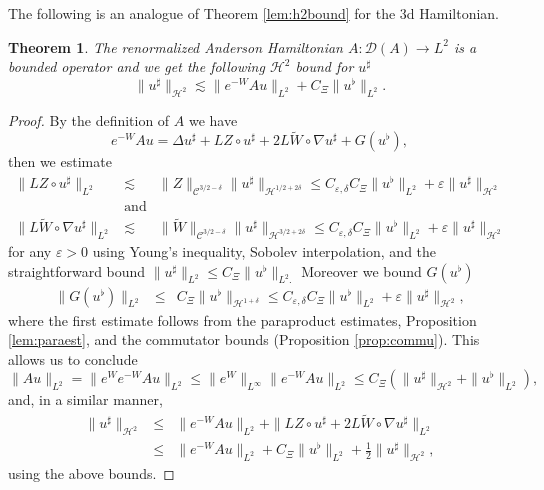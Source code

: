 \documentclass[11pt, oneside]{article}   	%
\newtheorem{theorem}{Theorem}[section]
\newcommand{\CC}{\mathscr{C}}
\newcommand{\ssp}{\mathscr{H}}
\begin{document}
%
The following is an analogue of Theorem \ref{lem:h2bound} for the 3d
Hamiltonian.
%
\begin{theorem} \label{thm:3dusharpbound}
	The renormalized Anderson Hamiltonian 
	$A : \mathscr{D}(A) \rightarrow L^2$
	is a bounded operator and we get the following $\ssp^2$ bound for $u^{\sharp}$
	\begin{equation} \label{equ:usharpBound}
	\| u^{\sharp} \|_{\ssp^2} \lesssim \| e^{- W} A u \|_{L^2} + C_{\Xi} \|
	u^{\flat} \|_{L^2} . 
	\end{equation}
\end{theorem}
%
\begin{proof}
	By the definition of $A$ we have
	\[ e^{- W} A u = \Delta u^{\sharp} + L Z \circ u^{\sharp} + 2L \widetilde{W}
	\circ \nabla u^{\sharp} + G (u^{\flat}), \]
	then we estimate\quad
	\begin{eqnarray*}
		\| L Z \circ u^{\sharp} \|_{L^2} & \lesssim & \| Z \|_{\CC^{3 / 2
				- \delta}} \| u^{\sharp} \|_{\ssp^{1 / 2 + 2 \delta}} 
		 \le  C_{\varepsilon, \delta} C_{\Xi} \| u^{\flat} \|_{L^2} +
		\varepsilon \| u^{\sharp} \|_{\ssp^2}\\
		& \text{and} & \\
		\| L \widetilde{W} \circ \nabla u^{\sharp} \|_{L^2} & \lesssim & \| \widetilde{W}
		\|_{\CC^{3 / 2 - \delta}} \| u^{\sharp} \|_{\ssp^{3 / 2 + 2 \delta}}
		 \le  C_{\varepsilon, \delta} C_{\Xi} \| u^{\flat} \|_{L^2} +
		\varepsilon \| u^{\sharp} \|_{\ssp^2}
	\end{eqnarray*}
	for any $\varepsilon > 0$ using Young's inequality, Sobolev interpolation,
	and the straightforward bound $\| u^{\sharp} \|_{L^2} \le C_{\Xi} \|
	u^{\flat} \|_{L^2 .}$ Moreover we bound $G (u^{\flat})$
	\begin{eqnarray*}
		\| G (u^{\flat}) \|_{L^2} & \le & C_{\Xi} \| u^{\flat} \|_{\ssp^{1 +
				\delta}}
		 \le  C_{\varepsilon, \delta} C_{\Xi} \| u^{\flat} \|_{L^2} +
		\varepsilon \| u^{\sharp} \|_{\ssp^2},
	\end{eqnarray*}
	where the first estimate follows from the paraproduct estimates, Proposition
	\ref{lem:paraest}, and the commutator bounds  (Proposition
	\ref{prop:commu}). This allows us to conclude
	\begin{equation} \label{equ:usharpbound2}
		\| A u \|_{L^2}  =  \| e^W e^{- W} A u \|_{L^2}
		 \le  \| e^W \|_{L^{\infty}} \| e^{- W} A u \|_{L^2}
		\le  C_{\Xi} (\| u^{\sharp} \|_{\ssp^2} + \| u^{\flat} \|_{L^2}),
	\end{equation}
	and, in a similar manner,
	\begin{eqnarray*}
		\| u^{\sharp} \|_{\ssp^2} & \le & \| e^{- W} A u \|_{L^2} + \| L Z
		\circ u^{\sharp} + 2L \widetilde{W} \circ \nabla u^{\sharp} \|_{L^2}\\
		& \le & \| e^{- W} A u \|_{L^2} + C_{\Xi} \| u^{\flat} \|_{L^2} +
		\frac{1}{2} \| u^{\sharp} \|_{\ssp^2},
	\end{eqnarray*}
	using the above bounds.
\end{proof}
\end{document}
